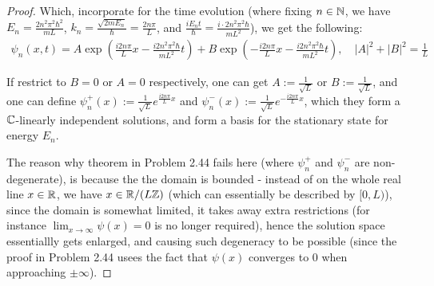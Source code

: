 \documentclass{article}
\begin{document}
\begin{proof}
    Which, incorporate for the time evolution (where fixing $n\in\mathbb{N}$, we have $E_n=\frac{2n^2\pi^2\hbar^2}{mL}$, $k_n = \frac{\sqrt{2mE_n}}{\hbar}=\frac{2n\pi}{L}$, and $\frac{iE_nt}{\hbar} = \frac{i\cdot 2n^2\pi^2\hbar}{mL^2}$), we get the following:
    \begin{align}
        \psi_n(x,t) = A\exp\left(\frac{i2n\pi}{L}x - \frac{i2n^2\pi^2\hbar}{mL^2}t\right) + B\exp\left(-\frac{i2n\pi}{L}x - \frac{i2n^2\pi^2\hbar}{mL^2}t\right),\quad |A|^2+|B|^2=\frac{1}{L}
    \end{align}

    \hfil

    If restrict to $B=0$ or $A=0$ respectively, one can get $A:=\frac{1}{\sqrt{L}}$ or $B:=\frac{1}{\sqrt{L}}$, and one can define $\psi_n^+(x):= \frac{1}{\sqrt{L}}e^{\frac{i2n\pi}{L}x}$ and $\psi_n^-(x):=\frac{1}{\sqrt{L}}e^{-\frac{i2n\pi}{L}x}$, which they form a $\mathbb{C}$-linearly independent solutions, and form a basis for the stationary state for energy $E_n$.

    The reason why theorem in Problem 2.44 fails here (where $\psi_n^+$ and $\psi_n^-$ are non-degenerate), is because the the domain is bounded - instead of on the whole real line $x\in\mathbb{R}$, we have $x\in\mathbb{R}/(L\mathbb{Z})$ (which can essentially be described by $[0,L)$), since the domain is somewhat limited, it takes away extra restrictions (for instance $\lim_{x\rightarrow\infty}\psi(x)=0$ is no longer required), hence the solution space essentiallly gets enlarged, and causing such degeneracy to be possible (since the proof in Problem 2.44 usees the fact that $\psi(x)$ converges to $0$ when approaching $\pm\infty$).
\end{proof}

\hfil
\end{document}
